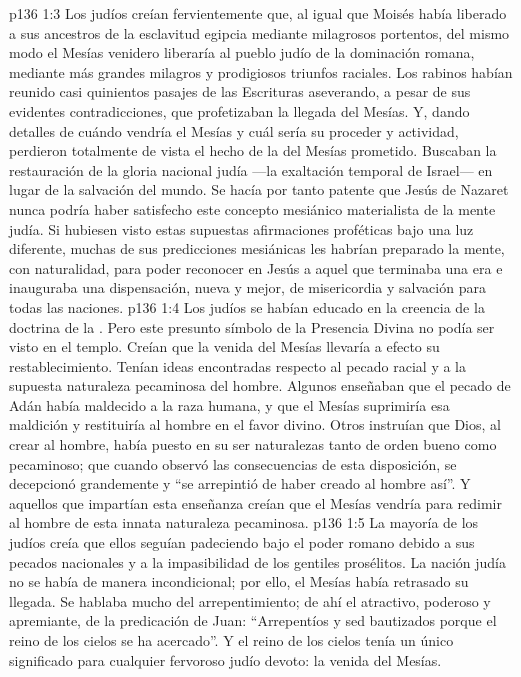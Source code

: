 \vs p136 1:3 Los judíos creían fervientemente que, al igual que Moisés había liberado a sus ancestros de la esclavitud egipcia mediante milagrosos portentos, del mismo modo el Mesías venidero liberaría al pueblo judío de la dominación romana, mediante más grandes milagros y prodigiosos triunfos raciales. Los rabinos habían reunido casi quinientos pasajes de las Escrituras aseverando, a pesar de sus evidentes contradicciones, que profetizaban la llegada del Mesías. Y, dando detalles de cuándo vendría el Mesías y cuál sería su proceder y actividad, perdieron totalmente de vista el hecho de la  del Mesías prometido. Buscaban la restauración de la gloria nacional judía ---la exaltación temporal de Israel--- en lugar de la salvación del mundo. Se hacía por tanto patente que Jesús de Nazaret nunca podría haber satisfecho este concepto mesiánico materialista de la mente judía. Si hubiesen visto estas supuestas afirmaciones proféticas bajo una luz diferente, muchas de sus predicciones mesiánicas les habrían preparado la mente, con naturalidad, para poder reconocer en Jesús a aquel que terminaba una era e inauguraba una dispensación, nueva y mejor, de misericordia y salvación para todas las naciones.
\vs p136 1:4 \pc Los judíos se habían educado en la creencia de la doctrina de la . Pero este presunto símbolo de la Presencia Divina no podía ser visto en el templo. Creían que la venida del Mesías llevaría a efecto su restablecimiento. Tenían ideas encontradas respecto al pecado racial y a la supuesta naturaleza pecaminosa del hombre. Algunos enseñaban que el pecado de Adán había maldecido a la raza humana, y que el Mesías suprimiría esa maldición y restituiría al hombre en el favor divino. Otros instruían que Dios, al crear al hombre, había puesto en su ser naturalezas tanto de orden bueno como pecaminoso; que cuando observó las consecuencias de esta disposición, se decepcionó grandemente y “se arrepintió de haber creado al hombre así”. Y aquellos que impartían esta enseñanza creían que el Mesías vendría para redimir al hombre de esta innata naturaleza pecaminosa.
\vs p136 1:5 La mayoría de los judíos creía que ellos seguían padeciendo bajo el poder romano debido a sus pecados nacionales y a la impasibilidad de los gentiles prosélitos. La nación judía no se había  de manera incondicional; por ello, el Mesías había retrasado su llegada. Se hablaba mucho del arrepentimiento; de ahí el atractivo, poderoso y apremiante, de la predicación de Juan: “Arrepentíos y sed bautizados porque el reino de los cielos se ha acercado”. Y el reino de los cielos tenía un único significado para cualquier fervoroso judío devoto: la venida del Mesías.
